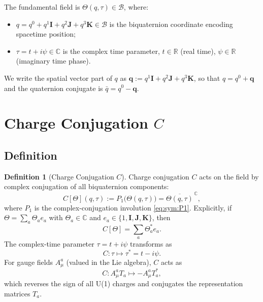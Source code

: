 \documentclass[12pt,a4paper]{article}
\theoremstyle{definition}
\newtheorem{definition}[theorem]{Definition}
\theoremstyle{remark}
\begin{document}
The fundamental field is $\Theta(q,\tau) \in \mathcal{B}$, where:
\begin{itemize}
  \item $q = q^0 + q^1\mathbf{I} + q^2\mathbf{J} + q^3\mathbf{K} \in \mathcal{B}$
    is the biquaternion coordinate encoding spacetime position;
  \item $\tau = t + i\psi \in \mathbb{C}$ is the complex time parameter,
    $t \in \mathbb{R}$ (real time), $\psi \in \mathbb{R}$ (imaginary time phase).
\end{itemize}

We write the spatial vector part of $q$ as
$\mathbf{q} := q^1\mathbf{I} + q^2\mathbf{J} + q^3\mathbf{K}$, so that
$q = q^0 + \mathbf{q}$ and the quaternion conjugate is
$\bar{q} = q^0 - \mathbf{q}$.

\section{Charge Conjugation $C$}
\label{sec:sym:C}

\subsection{Definition}

\begin{definition}[Charge Conjugation $C$]
\label{def:sym:C}
Charge conjugation $C$ acts on the field by complex conjugation of all
biquaternion components:
\begin{equation}
  C[\Theta](q,\tau) := P_1\!\bigl(\Theta(q,\tau)\bigr)
                     = \overline{\Theta(q,\tau)}^{\,\mathbb{C}},
  \label{eq:sym:C_field}
\end{equation}
where $P_1$ is the complex-conjugation involution \eqref{eq:sym:P1}.
Explicitly, if $\Theta = \sum_a \Theta_a e_a$ with
$\Theta_a \in \mathbb{C}$ and
$e_a \in \{1, \mathbf{I}, \mathbf{J}, \mathbf{K}\}$, then
\begin{equation}
  C[\Theta] = \sum_a \Theta_a^* e_a.
  \label{eq:sym:C_explicit}
\end{equation}
The complex-time parameter $\tau = t + i\psi$ transforms as
\begin{equation}
  C: \tau \mapsto \tau^* = t - i\psi.
  \label{eq:sym:C_tau}
\end{equation}
For gauge fields $A_\mu^a$ (valued in the Lie algebra), $C$ acts as
\begin{equation}
  C: A_\mu^a T_a \mapsto -A_\mu^a T_a^*,
  \label{eq:sym:C_gauge}
\end{equation}
which reverses the sign of all U(1) charges and conjugates the
representation matrices $T_a$.
\end{definition}
\end{document}
